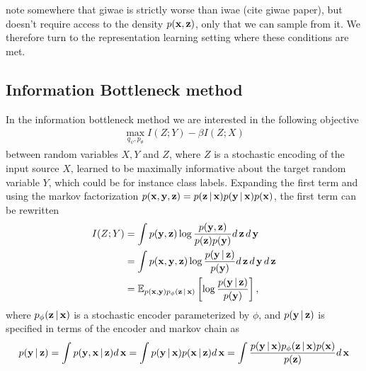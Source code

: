 \alert{note somewhere that giwae is strictly worse than iwae (cite giwae paper), but doesn't require access to the density $p(\vx,\vz)$, only that we can sample from it. We therefore turn to the representation learning setting where these conditions are met.}

\subsection{Information Bottleneck method}
In the information bottleneck method we are interested in the following objective 
\begin{align}
    \max_{q_\psi,p_{\theta}} I(Z ; Y) - \beta I(Z ; X)
\end{align}
between random variables $X,Y$ and $Z$, where $Z$ is a stochastic encoding of the input source $X$, learned to be maximally informative about the target random variable $Y$, which could be for instance class labels. Expanding the first term and using the markov factorization $p(\vx,\vy,\vz) = p(\vz|\vx)p(\vy|\vx)p(\vx)$, the first term can be rewritten 
\begin{align}
    I(Z ; Y) &= \int p(\vy, \vz) \log \frac{p(\vy, \vz)}{p(\vz)p(\vy)} d\vz d \vy \\
    &= \int p(\vx, \vy, \vz) \log \frac{p(\vy|\vz)}{p(\vy)} d\vz d\vy d\vz \\
    &= \E_{p(\vx, \vy) p_{\phi}(\vz|\vx)} \left[\log \frac{p(\vy|\vz)}{p(\vy)}\right]\label{eq:MI-IZY},
\end{align}
where $p_{\phi}(\vz|\vx)$ is a stochastic encoder parameterized by $\phi$, and $p(\vy|\vz)$ is specified in terms of the encoder and markov chain as 
\begin{align}
    p(\vy|\vz) = \int p(\vy, \vx|\vz) d \vx = \int p(\vy| \vx) p(\vx|\vz) d \vx = \int \frac{p(\vy|\vx)p_{\phi}(\vz|\vx)p(\vx)}{p(\vz)}  d \vx
\end{align}
